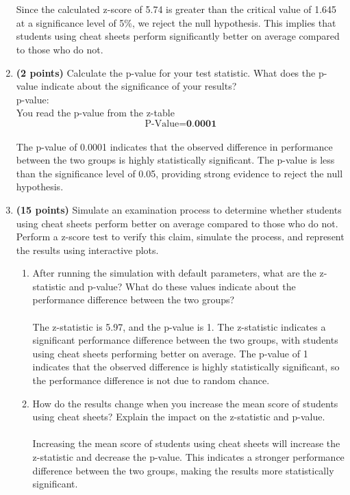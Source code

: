 \documentclass[a3paper,12pt]{extarticle} %
\begin{document}
\begin{enumerate}
   \\\\ Since the calculated z-score of 5.74 is greater than the critical value of 1.645 at a significance level of 5\%, we reject the null hypothesis. This implies that students using cheat sheets perform significantly better on average compared to those who do not.
    \item \textbf{(2 points)} Calculate the p-value for your test statistic. What does the p-value indicate about the
    significance of your results?
    \\ p-value:
    \\ You read the p-value from the z-table
    \[
    \text{P-Value} = \textbf{0.0001}
    \]
    \\ The p-value of 0.0001 indicates that the observed difference in performance between the two groups is highly statistically significant. The p-value is less than the significance level of 0.05, providing strong evidence to reject the null hypothesis.
    \item \textbf{(15 points)} Simulate an examination process to determine whether students using cheat sheets
    perform better on average compared to those who do not. Perform a z-score test to verify this
    claim, simulate the process, and represent the results using interactive plots.
    \begin{enumerate}
        \item After running the simulation with default parameters, what are the z-statistic and p-value?
        What do these values indicate about the performance difference between the two groups?
        \\\\ The z-statistic is  5.97, and the p-value is 1. The z-statistic indicates a significant performance difference between the two groups, with students using cheat sheets performing better on average. The p-value of 1 indicates that the observed difference is highly statistically significant, so the performance difference is not due to random chance.
        \item How do the results change when you increase the mean score of students using cheat sheets?
        Explain the impact on the z-statistic and p-value.
        \\\\ Increasing the mean score of students using cheat sheets will increase the z-statistic and decrease the p-value. This indicates a stronger performance difference between the two groups, making the results more statistically significant.

\end{enumerate}
\end{enumerate}
\end{document}
